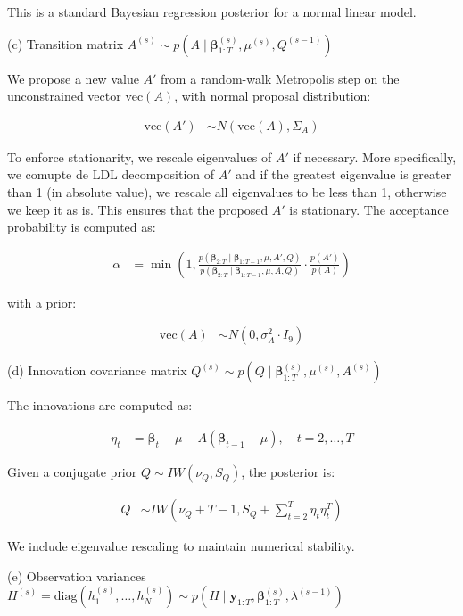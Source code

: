 This is a standard Bayesian regression posterior for a normal linear model.

(c) Transition matrix $A^{(s)} \sim p(A \mid \mathbf{\beta}_{1:T}^{(s)}, \mu^{(s)}, Q^{(s-1)})$

We propose a new value $A'$ from a random-walk Metropolis step on the unconstrained vector $\text{vec}(A)$, with normal proposal distribution:

\begin{align*}
\text{vec}(A') &\sim N(\text{vec}(A), \Sigma_A)
\end{align*}

To enforce stationarity, we rescale eigenvalues of $A'$ if necessary. More specifically, we comupte de LDL decomposition of $A'$ and if the greatest eigenvalue is greater  than 1 (in absolute value), we rescale all eigenvalues to be less than 1, otherwise we keep it as is. This ensures that the proposed $A'$ is stationary. The acceptance probability is computed as:

\begin{align*}
\alpha &= \min\left(1, \frac{p(\mathbf{\beta}_{2:T} \mid \mathbf{\beta}_{1:T-1}, \mu, A', Q)}{p(\mathbf{\beta}_{2:T} \mid \mathbf{\beta}_{1:T-1}, \mu, A, Q)} \cdot \frac{p(A')}{p(A)} \right)
\end{align*}

with a prior:

\begin{align*}
\text{vec}(A) &\sim N(0, \sigma_A^2 \cdot I_9)
\end{align*}

(d) Innovation covariance matrix $Q^{(s)} \sim p(Q \mid \mathbf{\beta}_{1:T}^{(s)}, \mu^{(s)}, A^{(s)})$

The innovations are computed as:

\begin{align*}
\eta_t &= \mathbf{\beta}_t - \mu - A(\mathbf{\beta}_{t-1} - \mu), \quad t=2, \dots, T
\end{align*}

Given a conjugate prior $Q \sim IW(\nu_Q, S_Q)$, the posterior is:

\begin{align*}
Q &\sim IW(\nu_Q + T - 1, S_Q + \sum_{t=2}^{T} \eta_t \eta_t^T)
\end{align*}

We include eigenvalue rescaling to maintain numerical stability.

(e) Observation variances $H^{(s)} = \text{diag}(h_1^{(s)}, \dots, h_N^{(s)}) \sim p(H \mid \mathbf{y}_{1:T}, \mathbf{\beta}_{1:T}^{(s)}, \lambda^{(s-1)})$

